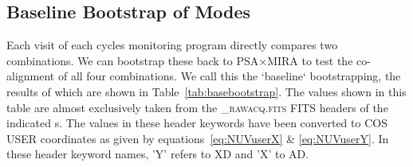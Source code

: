 \subsection{Baseline Bootstrap of  Modes}\label{subsec:basebootstrap}

Each visit of each cycles monitoring program directly compares two  combinations.
We can bootstrap these back to PSA$\times$MIRA to test the co-alignment of all four combinations.
We call this the `baseline` bootstrapping, the results of which are shown in Table~\ref{tab:basebootstrap}.
The values shown in this table are almost exclusively taken from the \textsc{\_rawacq.fits} FITS
headers of the indicated s. The values in these header keywords have been converted to
COS USER coordinates as given by equations~\ref{eq:NUVuserX} \& \ref{eq:NUVuserY}. In these header keyword names, 'Y' refers to XD and 'X' to AD.\\

